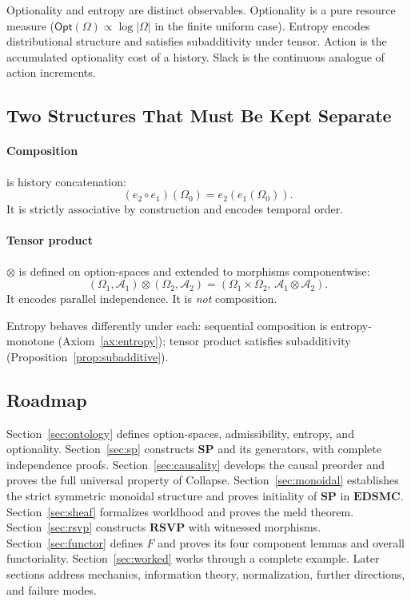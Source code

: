 \documentclass[12pt,a4paper]{article}
\theoremstyle{definition}
\theoremstyle{remark}
\newcommand{\Opt}{\ensuremath{\mathsf{Opt}}}
\newcommand{\SP}{\mathbf{SP}}
\newcommand{\RSVP}{\mathbf{RSVP}}
\newcommand{\EDSMC}{\mathbf{EDSMC}}
\newcommand{\tensor}{\otimes}
\begin{document}
Optionality and entropy are distinct observables. Optionality is a pure resource
measure ($\Opt(\Omega)\propto\log|\Omega|$ in the finite uniform case). Entropy
encodes distributional structure and satisfies subadditivity under tensor. Action
is the accumulated optionality cost of a history. Slack is the continuous analogue
of action increments.

\subsection{Two Structures That Must Be Kept Separate}

\paragraph{Composition} is history concatenation:
\[
  (e_2\circ e_1)(\Omega_0) = e_2(e_1(\Omega_0)).
\]
It is strictly associative by construction and encodes temporal order.

\paragraph{Tensor product} $\tensor$ is defined on option-spaces and extended to
morphisms componentwise:
\[
  (\Omega_1,\mathcal{A}_1)\tensor(\Omega_2,\mathcal{A}_2)
  = (\Omega_1\times\Omega_2,\,\mathcal{A}_1\tensor\mathcal{A}_2).
\]
It encodes parallel independence. It is \emph{not} composition.

Entropy behaves differently under each: sequential composition is entropy-monotone
(Axiom~\ref{ax:entropy}); tensor product satisfies subadditivity
(Proposition~\ref{prop:subadditive}).

\subsection{Roadmap}

Section~\ref{sec:ontology} defines option-spaces, admissibility, entropy, and
optionality. Section~\ref{sec:sp} constructs $\SP$ and its generators, with complete
independence proofs. Section~\ref{sec:causality} develops the causal preorder and
proves the full universal property of Collapse. Section~\ref{sec:monoidal} establishes
the strict symmetric monoidal structure and proves initiality of $\SP$ in $\EDSMC$.
Section~\ref{sec:sheaf} formalizes worldhood and proves the meld theorem.
Section~\ref{sec:rsvp} constructs $\RSVP$ with witnessed morphisms.
Section~\ref{sec:functor} defines $F$ and proves its four component lemmas and
overall functoriality. Section~\ref{sec:worked} works through a complete example.
Later sections address mechanics, information theory, normalization, further
directions, and failure modes.
\end{document}
